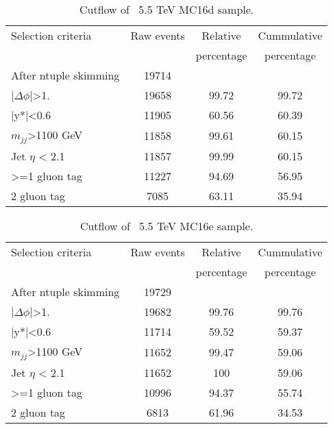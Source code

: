 \begin{table}[ht]
\begin{center}
\begin{tabular}{|l|c|c|c|}
\hline
Selection criteria & Raw events &  Relative & Cummulative \\
 & & percentage & percentage \\
\hline
After ntuple skimming & 19714 &  &  \\
$|\Delta\phi|$>1. & 19658 & 99.72 & 99.72 \\
|y*|<0.6 & 11905 & 60.56 & 60.39 \\
$m_{jj}$>1100 GeV & 11858 & 99.61 & 60.15 \\
Jet $\eta$ < 2.1 & 11857 & 99.99 & 60.15 \\
>=1 gluon tag & 11227 & 94.69 & 56.95 \\
2 gluon tag & 7085 & 63.11 & 35.94 \\
\hline
\end{tabular}
\end{center}
\caption{Cutflow of \Hprime\ 5.5 TeV MC16d sample.}
\end{table}

\begin{table}[ht]
\begin{center}
\begin{tabular}{|l|c|c|c|}
\hline
Selection criteria & Raw events &  Relative & Cummulative \\
 & & percentage & percentage \\
\hline
After ntuple skimming & 19729 &  &  \\
$|\Delta\phi|$>1. & 19682 & 99.76 & 99.76 \\
|y*|<0.6 & 11714 & 59.52 & 59.37 \\
$m_{jj}$>1100 GeV & 11652 & 99.47 & 59.06 \\
Jet $\eta$ < 2.1 & 11652 & 100 & 59.06 \\
>=1 gluon tag & 10996 & 94.37 & 55.74 \\
2 gluon tag & 6813 & 61.96 & 34.53 \\
\hline
\end{tabular}
\end{center}
\caption{Cutflow of \Hprime\ 5.5 TeV MC16e sample.}
\end{table}

